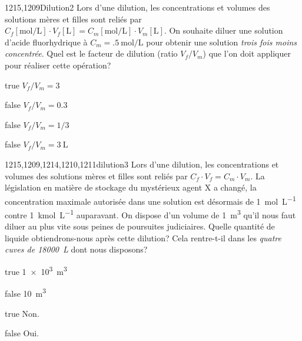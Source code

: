 \documentclass[11pt]{article}
\begin{document}
			\begin{question}{1215,1209}{Dilution}{2}{}
				Lors d'une dilution, les concentrations et volumes des solutions mères et filles sont reliés par $C_f[\si{\mole\per\liter}]\cdot V_f[\si{\liter}] = C_m[\si{\mole\per\liter}]\cdot V_m[\si{\liter}]$. On souhaite diluer une solution d'acide fluorhydrique à $C_m = \SI{.5}{\mole\per\liter}$ pour obtenir une solution \emph{trois fois moins concentrée}. Quel est le facteur de dilution (ratio $V_f/V_m$) que l'on doit appliquer pour réaliser cette opération?
			\end{question}
			\begin{reponses}
				\item[true] $V_f/V_m = \num{3}$
				\item[false] $V_f/V_m = \num{0.3}$
				\item[false] $V_f/V_m = 1/3$
				\item[false] $V_f/V_m = \SI{3}{\liter}$
			\end{reponses}
		
			\begin{question}{1215,1209,1214,1210,1211}{dilution}{3}{}
				Lors d'une dilution, les concentrations et volumes des solutions mères et filles sont reliés par $C_f\cdot V_f = C_m\cdot V_m$. La législation en matière de stockage du mystérieux agent X a changé, la concentration maximale autorisée dans une solution est désormais de \SI{1}{\mol\per\liter} contre \SI{1}{\kilo\mol\per\liter} auparavant. On dispose d'un volume de \SI{1}{\meter\cubed} qu'il nous faut diluer au plus vite sous peines de poursuites judiciaires. Quelle quantité de liquide obtiendrons-nous après cette dilution? Cela rentre-t-il dans les \emph{quatre cuves de \SI{18000}{\liter}} dont nous disposons?
			\end{question}
			\begin{reponses} 
				\item[true] \SI{1e3}{\meter\cubed}
				\item[false] \SI{10}{\meter\cubed}
				\item[true] Non.
				\item[false] Oui.
			\end{reponses}
			
\end{document}
